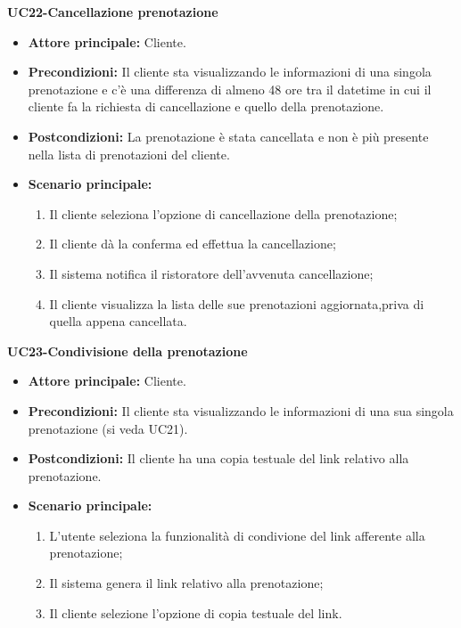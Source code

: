 \textbf{UC22-Cancellazione prenotazione}
\begin{itemize}
    \item \textbf{Attore principale: } Cliente.
    \item \textbf{Precondizioni: }Il cliente sta visualizzando le informazioni di una singola prenotazione
    e c'è una differenza di almeno 48 ore tra il datetime in cui il cliente fa la richiesta di cancellazione e quello della prenotazione.
    \item \textbf{Postcondizioni: }La prenotazione è stata cancellata e non è più presente nella lista di prenotazioni
    del cliente.
    \item \textbf{Scenario principale:} 
        \begin{enumerate}
            \item Il cliente seleziona l'opzione di cancellazione della prenotazione;
            \item Il cliente dà la conferma ed effettua la cancellazione;
            \item Il sistema notifica il ristoratore dell'avvenuta cancellazione;
            \item Il cliente visualizza la lista delle sue prenotazioni aggiornata,priva di quella appena
            cancellata.
        \end{enumerate}
\end{itemize}

\textbf{UC23-Condivisione della prenotazione}
\begin{itemize}
    \item \textbf{Attore principale: } Cliente.
    \item \textbf{Precondizioni: }Il cliente sta visualizzando le informazioni di una sua singola prenotazione (si veda UC21).
    \item \textbf{Postcondizioni: }Il cliente ha una copia testuale del link relativo alla prenotazione.
    \item \textbf{Scenario principale:} 
        \begin{enumerate}
            \item L'utente seleziona la funzionalità di condivione del link afferente alla prenotazione;
            \item Il sistema genera il link relativo alla prenotazione;
            \item Il cliente selezione l'opzione di copia testuale del link.
        \end{enumerate}
\end{itemize}

